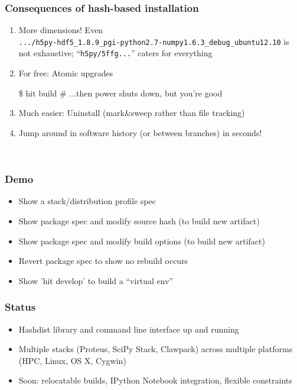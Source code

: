 \documentclass[sans,mathserif]{beamer}
\begin{document}
\begin{frame}[fragile]
  \frametitle{Consequences of hash-based installation}
  \begin{enumerate}
  \item<+-> More dimensions! Even \\
{\footnotesize
{\tt .../h5py-hdf5\_1.8.9\_pgi-python2.7-numpy1.6.3\_debug\_ubuntu12.10}
}
is not exhaustive; ``{\tt h5py/5ffg...}'' caters for everything

  \item<+-> For free: Atomic upgrades
\begin{semiverbatim}
\$ hit build
# ...then power shuts down, but you're good
\end{semiverbatim}

  \item<+-> Much easier: Uninstall (mark\&sweep rather than file tracking)

  \item<+-> Jump around in software history (or between branches) in seconds!


  \end{enumerate}

~

\end{frame}


\begin{frame}
\frametitle{Demo}
\begin{itemize}
\item Show a stack/distribution profile spec
\item Show package spec and modify source hash (to build new artifact)
\item Show package spec and modify build options (to build new artifact)
\item Revert package spec to show no rebuild occurs
\item Show 'hit develop' to build a ``virtual env''
\end{itemize}
\end{frame}

\begin{frame}
  \frametitle{Status}
  \begin{itemize}
  \item<+-> Hashdist library and command line interface up and running
  \item<+-> Multiple stacks (Proteus, SciPy Stack, Clawpack) across multiple platforms (HPC, Linux, OS X, Cygwin)
  \item<+-> Soon: relocatable builds, IPython Notebook integration, flexible constraints
  \end{itemize}
\end{frame}
\end{document}
